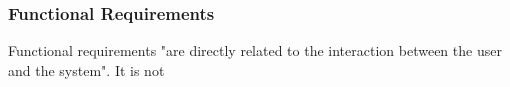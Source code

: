 \subsubsection{Functional Requirements}
Functional requirements "are directly related to the interaction between the user and the system"\cite{aauFunctionalRequirements}. It is not 

